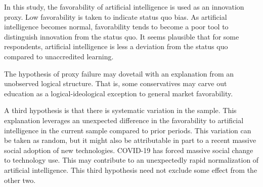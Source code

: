 \documentclass[review]{elsarticle}
\begin{document}
In this study, the favorability of artificial intelligence is used as an innovation proxy.
Low favorability is taken to indicate status quo bias.
As artificial intelligence becomes normal,
favorability tends to become a poor tool to distinguish innovation from the status quo.
It seems plausible that for some respondents,
artificial intelligence is less a deviation from the status quo
compared to unaccredited learning.

The hypothesis of proxy failure may dovetail with an explanation from an unobserved logical structure.
That is, some conservatives may carve out education as a logical-ideological exception to general market favorability.

A third hypothesis is that there is systematic variation in the sample.
This explanation leverages an unexpected difference in the favorability to artificial intelligence
in the current sample compared to prior periods.
This variation can be taken as random,
but it might also be attributable in part to a recent massive social adoption of new technologies.
COVID-19 has forced massive social change to technology use.
This may contribute to an unexpectedly rapid normalization of artificial intelligence.
This third hypothesis need not exclude some effect from the other two.


\end{document}
